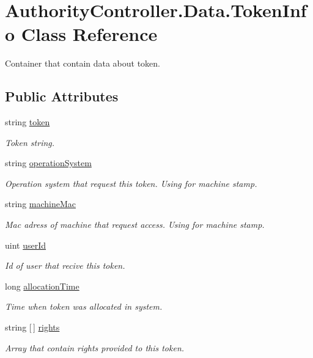 \hypertarget{class_authority_controller_1_1_data_1_1_token_info}{}\section{Authority\+Controller.\+Data.\+Token\+Info Class Reference}
\label{class_authority_controller_1_1_data_1_1_token_info}


Container that contain data about token.  


\subsection*{Public Attributes}
\begin{DoxyCompactItemize}
\item 
string \mbox{\hyperlink{class_authority_controller_1_1_data_1_1_token_info_a5039d141fce02bf9a1e4c28e8af24029}{token}}
\begin{DoxyCompactList}\small\item\em Token string. \end{DoxyCompactList}\item 
string \mbox{\hyperlink{class_authority_controller_1_1_data_1_1_token_info_a30eb024f5d8ba8c13dd53ff1540e84ed}{operation\+System}}
\begin{DoxyCompactList}\small\item\em Operation system that request this token. Using for machine stamp. \end{DoxyCompactList}\item 
string \mbox{\hyperlink{class_authority_controller_1_1_data_1_1_token_info_afbe13ef6a63b2a4cff326cfc6b5637b0}{machine\+Mac}}
\begin{DoxyCompactList}\small\item\em Mac adress of machine that request access. Using for machine stamp. \end{DoxyCompactList}\item 
uint \mbox{\hyperlink{class_authority_controller_1_1_data_1_1_token_info_add082450b392251105bbed4327a7de4d}{user\+Id}}
\begin{DoxyCompactList}\small\item\em Id of user that recive this token. \end{DoxyCompactList}\item 
long \mbox{\hyperlink{class_authority_controller_1_1_data_1_1_token_info_a2885b65bcc52dd621a1220ac26a22a4b}{allocation\+Time}}
\begin{DoxyCompactList}\small\item\em Time when token was allocated in system. \end{DoxyCompactList}\item 
string \mbox{[}$\,$\mbox{]} \mbox{\hyperlink{class_authority_controller_1_1_data_1_1_token_info_adc68460cc2ff19c832e097e10694908c}{rights}}
\begin{DoxyCompactList}\small\item\em Array that contain rights provided to this token. \end{DoxyCompactList}\end{DoxyCompactItemize}
